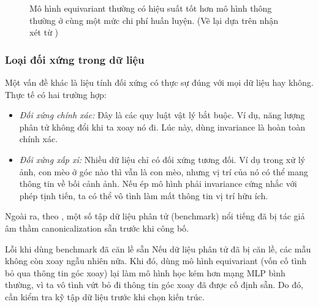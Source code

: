 \begin{figure}[H]
    \centering
    \caption[Tác động của tính đối xứng lên scaling laws]{Mô hình equivariant thường có hiệu suất tốt hơn mô hình thông thường ở cùng một mức chi phí huấn luyện. (Vẽ lại dựa trên nhận xét từ \cite{jegelka2025tutorial})}
    \label{fig:scaling-law-equivariant}
\end{figure}

\subsubsection{Loại đối xứng trong dữ liệu}

Một vấn đề khác là liệu tính đối xứng có thực sự đúng với mọi dữ liệu hay không. Thực tế có hai trường hợp:

\begin{itemize}
    \item \textit{Đối xứng chính xác:} Đây là các quy luật vật lý bắt buộc. Ví dụ, năng lượng phân tử không đổi khi ta xoay nó đi. Lúc này, dùng invariance là hoàn toàn chính xác.
    \item \textit{Đối xứng xấp xỉ:} Nhiều dữ liệu chỉ có đối xứng tương đối. Ví dụ trong xử lý ảnh, con mèo ở góc nào thì vẫn là con mèo, nhưng vị trí của nó có thể mang thông tin về bối cảnh ảnh. Nếu ép mô hình phải invariance cứng nhắc với phép tịnh tiến, ta có thể vô tình làm mất thông tin vị trí hữu ích.
\end{itemize}

Ngoài ra, theo \cite{jegelka2025tutorial}, một số tập dữ liệu phân tử (benchmark) nổi tiếng đã bị tác giả âm thầm canonicalization sẵn trước khi công bố. 

\begin{warningbox}{Lỗi khi dùng benchmark đã căn lề sẵn}
Nếu dữ liệu phân tử đã bị căn lề, các mẫu không còn xoay ngẫu nhiên nữa. Khi đó, dùng mô hình equivariant (vốn cố tình bỏ qua thông tin góc xoay) lại làm mô hình học kém hơn mạng MLP bình thường, vì ta vô tình vứt bỏ đi thông tin góc xoay đã được cố định sẵn. Do đó, cần kiểm tra kỹ tập dữ liệu trước khi chọn kiến trúc.
\end{warningbox}

